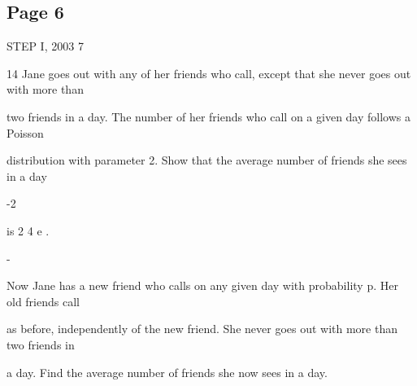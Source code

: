 \documentclass[12pt]{article}
\begin{document}
\subsection*{Page 6}
\begin{flushleft}
STEP I, 2003 7\par
14 Jane goes out with any of her friends who call, except that she never goes out with more than\par
two friends in a day. The number of her friends who call on a given day follows a Poisson\par
distribution with parameter 2. Show that the average number of friends she sees in a day\par
-2\par
is 2 4 e .\par
-\par
Now Jane has a new friend who calls on any given day with probability p. Her old friends call\par
as before, independently of the new friend. She never goes out with more than two friends in\par
a day. Find the average number of friends she now sees in a day.\par
\end{flushleft}
\end{document}
